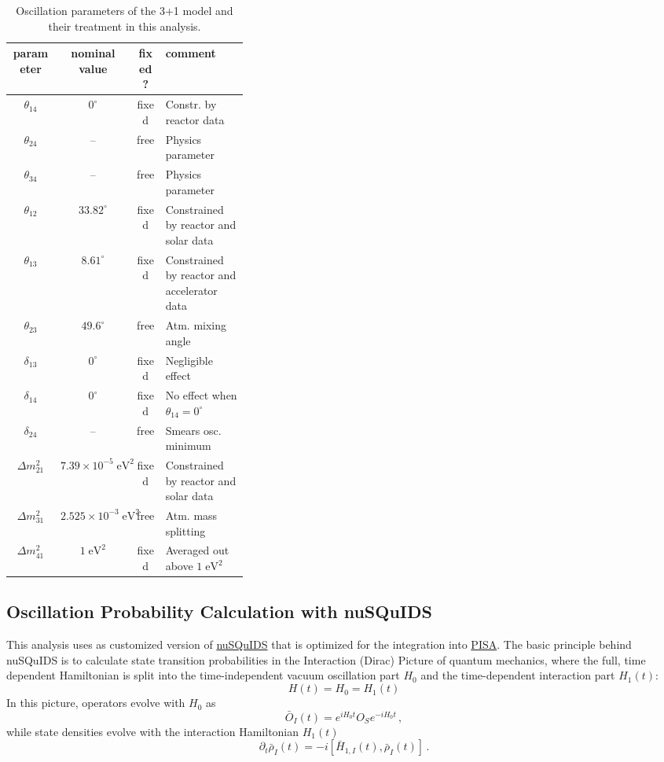 \begin{table}
    \centering
    \begin{tabular}{@{}cccp{0.35 \linewidth}@{}}\toprule
        \textbf{parameter} & \textbf{nominal value} & \textbf{fixed?} & \textbf{comment} \\
        \midrule
        $\theta_{14}$ & $0^\circ$ & fixed &  Constr. by reactor data \\
        $\theta_{24}$ & -- & free & Physics parameter\\
        $\theta_{34}$ & -- & free & Physics parameter\\
        $\theta_{12}$ & $33.82^\circ$ & fixed & Constrained by reactor and solar data \\
        $\theta_{13}$ & $8.61^\circ$ & fixed & Constrained by reactor and accelerator data \\
        $\theta_{23}$ & $49.6^\circ$ & free & Atm. mixing angle \\
        $\delta_{13}$ & $0^\circ$ & fixed &  Negligible effect \\
        $\delta_{14}$ & $0^\circ$ & fixed &  No effect when $\theta_{14} = 0^\circ$ \\
        $\delta_{24}$ & -- & free & Smears osc. minimum \\
        $\Delta m^2_{21}$ & $7.39\times10^{-5}\;\mathrm{eV^2}$ & fixed & Constrained by reactor and solar data \\
        $\Delta m^2_{31}$ & $2.525\times10^{-3}\;\mathrm{eV^2}$ & free & Atm. mass splitting \\
        $\Delta m^2_{41}$ & $1\;\mathrm{eV^2}$ & fixed & Averaged out above $1\;\mathrm{eV^2}$ \\
        \bottomrule
    \end{tabular}
    \caption{Oscillation parameters of the 3+1 model and their treatment in this analysis.}
    \label{tab:oscillation-parameters}
\end{table}

\subsection{Oscillation Probability Calculation with nuSQuIDS}
\label{sec:nusquids}

This analysis uses as customized version of \href{https://github.com/ts4051/nuSQuIDS}{nuSQuIDS} that is optimized for the integration into \href{https://github.com/icecube/pisa}{PISA}. The basic principle behind nuSQuIDS is to calculate state transition probabilities in the Interaction (Dirac) Picture of quantum mechanics, where the full, time dependent Hamiltonian is split into the time-independent vacuum oscillation part $H_0$ and the time-dependent interaction part $ H_1(t)$:
$$ H(t) = H_0 = H_1(t)$$
In this picture, operators evolve with $ H_0$ as
$$
\bar{O}_I(t)=e^{iH_0t}O_Se^{-iH_0t}\,,
$$
while state densities evolve with the interaction Hamiltonian $ H_1(t)$
$$
\partial_t\bar{\rho}_I(t)=-i[\bar{H}_{1, I}(t), \bar{\rho}_I(t)]\,.
$$

